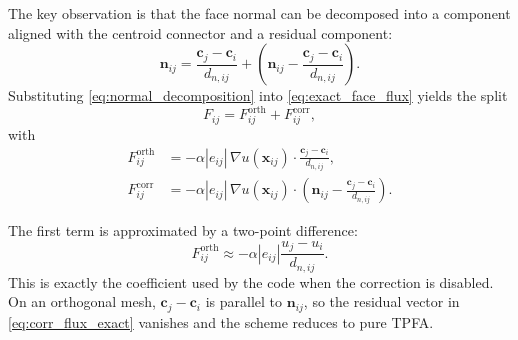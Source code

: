 \documentclass[11pt]{article}
\theoremstyle{plain}
\theoremstyle{definition}
\theoremstyle{remark}
\numberwithin{equation}{section}
\begin{document}
The key observation is that the face normal can be decomposed into a component aligned with the centroid connector and a residual component:
\begin{equation}
\label{eq:normal_decomposition}
\bm{n}_{ij}
= \frac{\bm{c}_j - \bm{c}_i}{d_{n,ij}}
  + \left(
      \bm{n}_{ij}
      - \frac{\bm{c}_j - \bm{c}_i}{d_{n,ij}}
    \right).
\end{equation}
Substituting \cref{eq:normal_decomposition} into \cref{eq:exact_face_flux} yields the split
\begin{equation}
\label{eq:flux_split}
F_{ij} = F_{ij}^{\mathrm{orth}} + F_{ij}^{\mathrm{corr}},
\end{equation}
with
\begin{align}
F_{ij}^{\mathrm{orth}}
&= - \alpha |e_{ij}| \,
\nabla u(\bm{x}_{ij}) \cdot
\frac{\bm{c}_j - \bm{c}_i}{d_{n,ij}},
\label{eq:orth_flux_exact} \\
F_{ij}^{\mathrm{corr}}
&= - \alpha |e_{ij}| \,
\nabla u(\bm{x}_{ij}) \cdot
\left(
\bm{n}_{ij} - \frac{\bm{c}_j - \bm{c}_i}{d_{n,ij}}
\right).
\label{eq:corr_flux_exact}
\end{align}

The first term is approximated by a two-point difference:
\begin{equation}
\label{eq:orth_flux_discrete}
F_{ij}^{\mathrm{orth}}
\approx
- \alpha |e_{ij}| \frac{u_j - u_i}{d_{n,ij}}.
\end{equation}
This is exactly the coefficient used by the code when the correction is disabled. On an orthogonal mesh, $\bm{c}_j - \bm{c}_i$ is parallel to $\bm{n}_{ij}$, so the residual vector in \cref{eq:corr_flux_exact} vanishes and the scheme reduces to pure TPFA.
\end{document}

